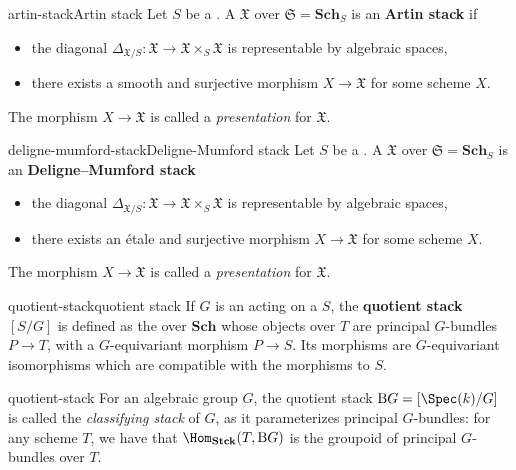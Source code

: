 \begin{topic}{artin-stack}{Artin stack}
    Let $S$ be a . A  $\mathfrak{X}$ over $\mathfrak{S} = \textbf{Sch}_S$ is an \textbf{Artin stack} if
    \begin{itemize}
        \item the diagonal $\Delta_{\mathfrak{X}/S} : \mathfrak{X} \to \mathfrak{X} \times_S \mathfrak{X}$ is representable by algebraic spaces,
        \item there exists a smooth and surjective morphism $X \to \mathfrak{X}$ for some scheme $X$.
    \end{itemize}
    The morphism $X \to \mathfrak{X}$ is called a \textit{presentation} for $\mathfrak{X}$.
\end{topic}

\begin{topic}{deligne-mumford-stack}{Deligne-Mumford stack}
    Let $S$ be a . A  $\mathfrak{X}$ over $\mathfrak{S} = \textbf{Sch}_S$ is an \textbf{Deligne--Mumford stack}
    \begin{itemize}
        \item the diagonal $\Delta_{\mathfrak{X}/S} : \mathfrak{X} \to \mathfrak{X} \times_S \mathfrak{X}$ is representable by algebraic spaces,
        \item there exists an étale and surjective morphism $X \to \mathfrak{X}$ for some scheme $X$.
    \end{itemize}
    The morphism $X \to \mathfrak{X}$ is called a \textit{presentation} for $\mathfrak{X}$.
\end{topic}

\begin{topic}{quotient-stack}{quotient stack}
    If $G$ is an  acting on a  $S$, the \textbf{quotient stack} $[S/G]$ is defined as the  over $\textbf{Sch}$ whose objects over $T$ are principal $G$-bundles $P \to T$, with a $G$-equivariant morphism $P \to S$. Its morphisms are $G$-equivariant isomorphisms which are compatible with the morphisms to $S$.
\end{topic}

\begin{example}{quotient-stack}
    For an algebraic group $G$, the quotient stack $\textup{B}G = [\Spec(k) / G]$ is called the \textit{classifying stack} of $G$, as it parameterizes principal $G$-bundles: for any scheme $T$, we have that $\Hom_{\textbf{Stck}}(T, \textup{B}G)$ is the groupoid of principal $G$-bundles over $T$.
\end{example}

